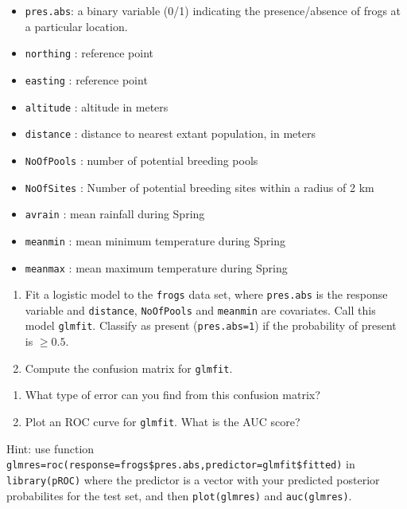 \documentclass[]{article}
\providecommand{\tightlist}{%
  \setlength{\itemsep}{0pt}\setlength{\parskip}{0pt}}
\begin{document}
\begin{itemize}
\tightlist
\item
  \texttt{pres.abs}: a binary variable (0/1) indicating the
  presence/absence of frogs at a particular location.
\item
  \texttt{northing} : reference point
\item
  \texttt{easting} : reference point
\item
  \texttt{altitude} : altitude in meters
\item
  \texttt{distance} : distance to nearest extant population, in meters
\item
  \texttt{NoOfPools} : number of potential breeding pools
\item
  \texttt{NoOfSites} : Number of potential breeding sites within a
  radius of 2 km
\item
  \texttt{avrain} : mean rainfall during Spring
\item
  \texttt{meanmin} : mean minimum temperature during Spring
\item
  \texttt{meanmax} : mean maximum temperature during Spring
\end{itemize}

\begin{enumerate}
\def\labelenumi{\alph{enumi}.}
\setcounter{enumi}{1}
\item
  Fit a logistic model to the \texttt{frogs} data set, where
  \texttt{pres.abs} is the response variable and \texttt{distance},
  \texttt{NoOfPools} and \texttt{meanmin} are covariates. Call this
  model \texttt{glmfit}. Classify as present (\texttt{pres.abs=1}) if
  the probability of present is \(\ge 0.5\).
\item
  Compute the confusion matrix for \texttt{glmfit}.
\end{enumerate}

\begin{enumerate}
\def\labelenumi{\roman{enumi}.}
\setcounter{enumi}{1}
\tightlist
\item
  What type of error can you find from this confusion matrix?
\item
  Plot an ROC curve for \texttt{glmfit}. What is the AUC score?
\end{enumerate}

Hint: use function
\texttt{glmres=roc(response=frogs\$pres.abs,predictor=glmfit\$fitted)}
in \texttt{library(pROC)} where the predictor is a vector with your
predicted posterior probabilites for the test set, and then
\texttt{plot(glmres)} and \texttt{auc(glmres)}.
\end{document}
